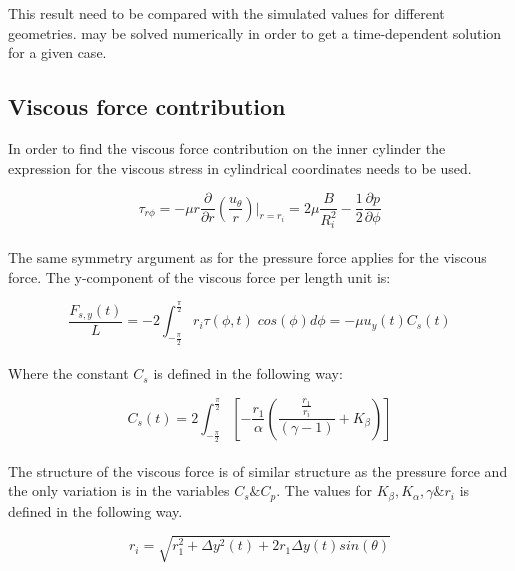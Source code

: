 \noindent This result need to be compared with the simulated values for different geometries.  may be solved numerically in order to get a time-dependent solution for a given case.

\subsection{Viscous force contribution}

In order to find the viscous force contribution on the inner cylinder the expression for the viscous stress in cylindrical coordinates needs to be used.

	\begin{equation}
		\tau_{r \phi} = -\mu r \frac{\partial}{\partial r} \left(\frac{u_{\theta}}{r} \right) \bigg|_{r=r_i} = 2 \mu \frac{B}{R_i^2}-\frac{1}{2}\frac{\partial p}{\partial \phi}
	\label{eq:Viscous_distribution}
	\end{equation}\\

\noindent The same symmetry argument as for the pressure force applies for the viscous force. The y-component of the viscous force per length unit is:

	\begin{equation}
		\frac{F_{s,y}(t)}{L} = -2 \int_{-\frac{\pi}{2}}^{\frac{\pi}{2}}r_i \tau(\phi,t) \; cos(\phi) d\phi = -\mu u_y(t) C_s(t)
	\label{eq:viscous_force}
	\end{equation}\\

\noindent Where the constant $C_s$ is defined in the following way:

	\begin{equation}
		C_s(t) = 2 \int_{-\frac{\pi}{2}}^{\frac{\pi}{2}}\left[ -\frac{r_1}{\alpha} \left( \frac{\frac{r_1}{r_i}}{(\gamma-1)} + K_{\beta} \right) \right]
	\label{eq:viscous_force_const}
	\end{equation}\\

\noindent The structure of the viscous force is of similar structure as the pressure force and the only variation is in the variables $C_s \& C_p$. The values for $K_{\beta}, K_{\alpha}, \gamma \& r_i$ is defined in the following way.

\begin{equation}
r_i = \sqrt{r_1^2 + \Delta y^2(t) + 2r_1 \Delta y(t) sin(\theta)}
\label{eq:const_ri}
\end{equation}\\

